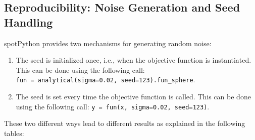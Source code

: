 \documentclass[
  letterpaper,
  DIV=11,
  numbers=noendperiod]{scrreprt}
\providecommand{\tightlist}{%
  \setlength{\itemsep}{0pt}\setlength{\parskip}{0pt}}\usepackage{longtable,booktabs,array}
\begin{document}
\subsection{Reproducibility: Noise Generation and Seed
Handling}\label{reproducibility-noise-generation-and-seed-handling}

spotPython provides two mechanisms for generating random noise:

\begin{enumerate}
\def\labelenumi{\arabic{enumi}.}
\tightlist
\item
  The seed is initialized once, i.e., when the objective function is
  instantiated. This can be done using the following call:
  \texttt{fun\ =\ analytical(sigma=0.02,\ seed=123).fun\_sphere}.
\item
  The seed is set every time the objective function is called. This can
  be done using the following call:
  \texttt{y\ =\ fun(x,\ sigma=0.02,\ seed=123)}.
\end{enumerate}

These two different ways lead to different results as explained in the
following tables:
\end{document}
